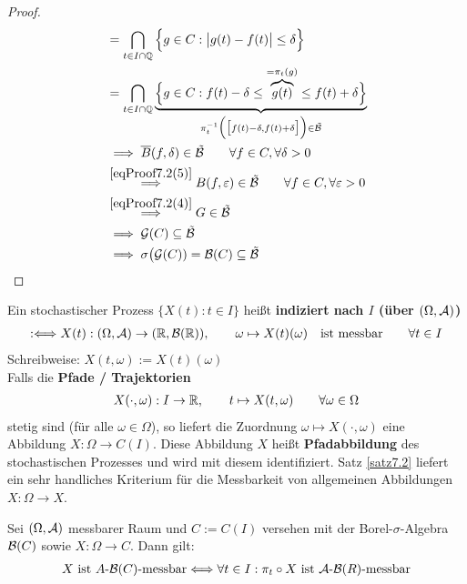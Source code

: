 \begin{proof}
\begin{align*}
		&=\bigcap\limits_{t\in I\cap\mathbb{Q}}\Big\lbrace g\in C:\big|g(t)-f(t)\big|\leq\delta\Big\rbrace\\
		&=\bigcap\limits_{t\in I\cap\mathbb{Q}}\underbrace{\Big\lbrace g\in C:f(t)-\delta\leq \overbrace{g(t)}^{=\pi_t(g)}\leq f(t)+\delta\Big\rbrace}_{\pi_t^{-1}\Big(\big[f(t)-\delta,f(t)+\delta\big]\Big)\in\tilde{\mathcal{B}}}\\
		&\implies
		\overline{B}(f,\delta)\in\tilde{\mathcal{B}}\qquad\forall f\in C,\forall\delta>0\\
		&\stackrel{\eqref{eqProof7.2(5)}}{\implies}
		B(f,\varepsilon)\in\tilde{\mathcal{B}}\qquad\forall f\in C,\forall\varepsilon>0\\
		&\stackrel{\eqref{eqProof7.2(4)}}{\implies}
		G\in\tilde{\mathcal{B}}\\
		&\implies
		\mathcal{G}(C)\subseteq\tilde{\mathcal{B}}\\
		&\implies\sigma\big(\mathcal{G}(C))=\mathcal{B}(C)\subseteq\tilde{\mathcal{B}}
	\end{align*}
\end{proof}

Ein stochastischer Prozess $\big\lbrace X(t):t\in I\big\rbrace$ heißt \textbf{indiziert nach $I$ (über $(\Omega,\mathcal{A})$)}
\begin{align*}
	:\Longleftrightarrow X(t):(\Omega,\mathcal{A})\to(\mathbb{R},\mathcal{B}(\mathbb{R})),
	\qquad\omega\mapsto X(t)(\omega)\quad
	\text{ist messbar}\qquad\forall t\in I
\end{align*}
Schreibweise: $X(t,\omega):=X(t)(\omega)$\\
Falls die \textbf{Pfade / Trajektorien}
\begin{align*}
	X(\cdot,\omega):I\to\mathbb{R},\qquad t\mapsto X(t,\omega)\qquad\forall \omega\in\Omega
\end{align*}
stetig sind (für alle $\omega\in\Omega$), so liefert die Zuordnung $\omega\mapsto X(\cdot,\omega)$ eine Abbildung $X:\Omega\to C(I)$. 
Diese Abbildung $X$ heißt \textbf{Pfadabbildung} des stochastischen Prozesses und wird mit diesem identifiziert.\nl
Satz \ref{satz7.2} liefert ein sehr handliches Kriterium für die Messbarkeit von allgemeinen Abbildungen $X:\Omega\to X$.

\begin{satz}\label{satz7.3}
	Sei $(\Omega,\mathcal{A})$ messbarer Raum und $C:=C(I)$ versehen mit der Borel-$\sigma$-Algebra $\mathcal{B}(C)$ sowie $X:\Omega\to C$. Dann gilt:
	\begin{align*}
		X\text{ ist }A\text{-}\mathcal{B}(C)\text{-messbar}\Longleftrightarrow\forall t\in I:\pi_t\circ X\text { ist }\mathcal{A}\text{-}\mathcal{B}(R)\text{-messbar}
	\end{align*}
\end{satz}

